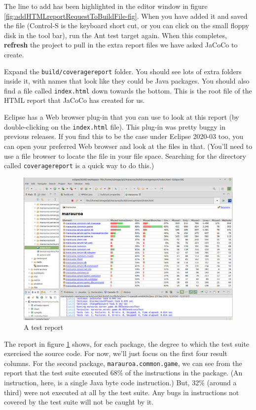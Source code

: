 \documentclass[
]{book}
\begin{document}
The line to add has been highlighted in the editor window in figure \ref{fig:addHTMLreportRequestToBuildFile-fig}. When you have added it and saved the file (Control-S is the keyboard short cut, or you can click on the small floppy disk in the tool bar), run the Ant test target again. When this completes, \textbf{refresh} the project to pull in the extra report files we have asked JaCoCo to create.

Expand the \texttt{build/coveragereport} folder. You should see lots of extra folders inside it, with names that look like they could be Java packages. You should also find a file called \texttt{index.html} down towards the bottom. This is the root file of the HTML report that JaCoCo has created for us.

Eclipse has a Web browser plug-in that you can use to look at this report (by double-clicking on the \texttt{index.html} file). This plug-in was pretty buggy in previous releases. If you find this to be the case under Eclipse 2020-03 too, you can open your preferred Web browser and look at the files in that. (You'll need to use a file browser to locate the file in your file space. Searching for the directory called \texttt{coveragereport} is a quick way to do this.)

\begin{figure}

{\centering \includegraphics[width=1\linewidth]{images/3.3.7showCoverageReport} 

}

\caption{A test report}\label{fig:showCoverageReport-fig}
\end{figure}

The report in figure \ref{fig:showCoverageReport-fig} shows, for each package, the degree to which the test suite exercised the source code. For now, we'll just focus on the first four result columns. For the second package, \texttt{marauroa.common.game}, we can see from the report that the test suite executed 68\% of the instructions in the package. (An instruction, here, is a single Java byte code instruction.) But, 32\% (around a third) were not executed at all by the test suite. Any bugs in instructions not covered by the test suite will not be caught by it.
\end{document}
